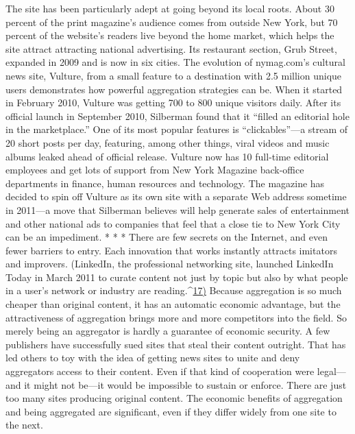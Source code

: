 The site has been particularly adept at going beyond its local roots. About 30
percent of the print magazine's audience comes from outside New York, but 70
percent of the website's readers live beyond the home market, which helps the
site attract attracting national advertising. Its restaurant section, Grub Street, expanded
in 2009 and is now in six cities.
The evolution of nymag.com's cultural news site, Vulture, from a small feature
to a destination with 2.5 million unique users demonstrates how powerful aggregation
strategies can be. When it started in February 2010, Vulture was getting
700 to 800 unique visitors daily. After its official launch in September 2010,
Silberman found that it ``filled an editorial hole in the marketplace.'' One of its
most popular features is ``clickables''—a stream of 20 short posts per day, featuring,
among other things, viral videos and music albums leaked ahead of official
release. Vulture now has 10 full-time editorial employees and get lots of support
from New York Magazine back-office departments in finance, human resources
and technology. The magazine has decided to spin off Vulture as its own site with
a separate Web address sometime in 2011—a move that Silberman believes will
help generate sales of entertainment and other national ads to companies that feel
that a close tie to New York City can be an impediment.
* * *
There are few secrets on the Internet, and even fewer barriers to entry. Each
innovation that works instantly attracts imitators and improvers. (LinkedIn, the
professional networking site, launched LinkedIn Today in March 2011 to curate
content not just by topic but also by what people in a user's network or industry
are reading.^{\href{#endnotes-chapter-6}{17)}} Because aggregation is so much cheaper than original content,
it has an automatic economic advantage, but the attractiveness of aggregation
brings more and more competitors into the field. So merely being an aggregator
is hardly a guarantee of economic security.
A few publishers have successfully sued sites that steal their content outright.
That has led others to toy with the idea of getting news sites to unite and deny
aggregators access to their content. Even if that kind of cooperation were legal—
and it might not be—it would be impossible to sustain or enforce. There are just
too many sites producing original content. The economic benefits of aggregation
and being aggregated are significant, even if they differ widely from one site to
the next.

